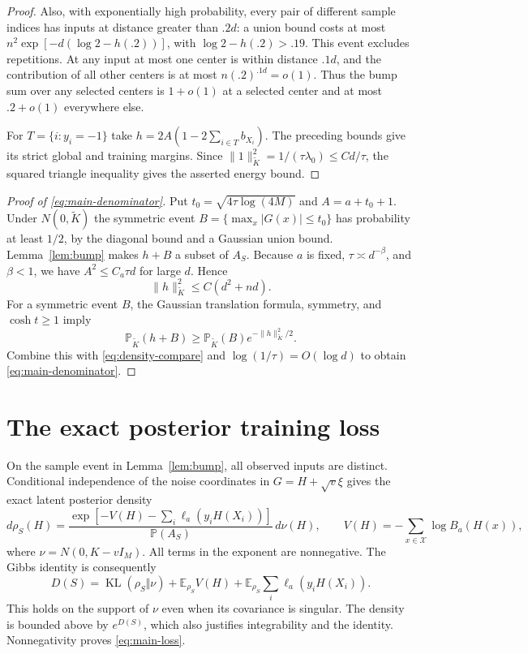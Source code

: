 \documentclass[11pt]{article}
\theoremstyle{remark}\newtheorem{remark}[theorem]{Remark}
\DeclareMathOperator{\KL}{KL}
\newcommand{\E}{\mathbb E}
\newcommand{\Pp}{\mathbb P}
\begin{document}
\begin{proof}
Also, with exponentially high probability, every pair of different sample indices has inputs at distance greater than $.2d$: a union bound costs at most $n^2\exp[-d(\log2-h(.2))]$, with $\log2-h(.2)>.19$. This event excludes repetitions. At any input at most one center is within distance $.1d$, and the contribution of all other centers is at most $n(.2)^{.1d}=o(1)$. Thus the bump sum over any selected centers is $1+o(1)$ at a selected center and at most $.2+o(1)$ everywhere else.

For $T=\{i:y_i=-1\}$ take $h=2A(1-2\sum_{i\in T}b_{X_i})$. The preceding bounds give its strict global and training margins. Since $\|1\|_{\widetilde K}^2=1/(\tau\lambda_0)\le Cd/\tau$, the squared triangle inequality gives the asserted energy bound.
\end{proof}

\begin{proof}[Proof of \eqref{eq:main-denominator}]
Put $t_0=\sqrt{4\tau\log(4M)}$ and $A=a+t_0+1$. Under $N(0,\widetilde K)$ the symmetric event $B=\{\max_x|G(x)|\le t_0\}$ has probability at least $1/2$, by the diagonal bound and a Gaussian union bound. Lemma~\ref{lem:bump} makes $h+B$ a subset of $A_S$. Because $a$ is fixed, $\tau\asymp d^{-\beta}$, and $\beta<1$, we have $A^2\le C_a\tau d$ for large $d$. Hence
\[
 \|h\|_{\widetilde K}^2\le C(d^2+nd).
\]
For a symmetric event $B$, the Gaussian translation formula, symmetry, and $\cosh t\ge1$ imply
\[
 \Pp_{\widetilde K}(h+B)\ge \Pp_{\widetilde K}(B)e^{-\|h\|_{\widetilde K}^2/2}.
\]
Combine this with \eqref{eq:density-compare} and $\log(1/\tau)=O(\log d)$ to obtain \eqref{eq:main-denominator}.
\end{proof}

\section{The exact posterior training loss}
On the sample event in Lemma~\ref{lem:bump}, all observed inputs are distinct. Conditional independence of the noise coordinates in $G=H+\sqrt v\xi$ gives the exact latent posterior density
\[
 d\rho_S(H)=\frac{\exp[-V(H)-\sum_i\ell_a(y_iH(X_i))]}{\Pp(A_S)}\,d\nu(H),
 \qquad V(H)=-\sum_{x\in\mathcal X}\log B_a(H(x)),
\]
where $\nu=N(0,K-vI_M)$. All terms in the exponent are nonnegative. The Gibbs identity is consequently
\begin{equation}\label{eq:gibbs}
 D(S)=\KL(\rho_S\Vert\nu)+\E_{\rho_S}V(H)+\E_{\rho_S}\sum_i\ell_a(y_iH(X_i)).
\end{equation}
This holds on the support of $\nu$ even when its covariance is singular. The density is bounded above by $e^{D(S)}$, which also justifies integrability and the identity. Nonnegativity proves \eqref{eq:main-loss}.
\end{document}
